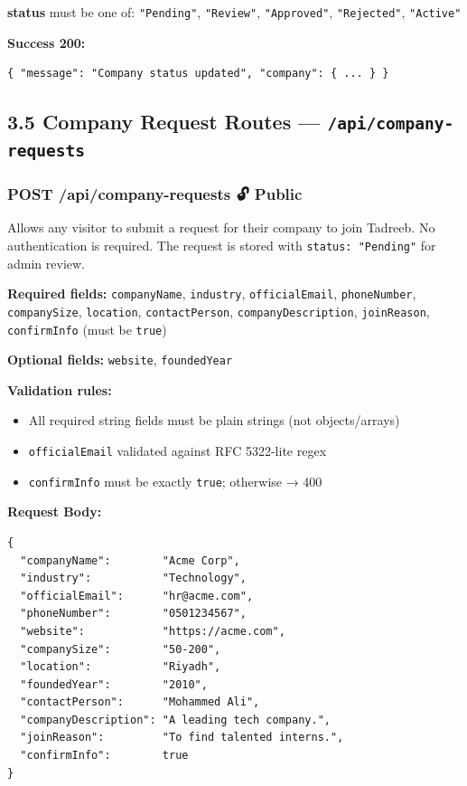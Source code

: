 \documentclass[12pt,a4paper]{article}
\begin{document}
\textbf{status} must be one of: \texttt{"Pending"}, \texttt{"Review"}, \texttt{"Approved"}, \texttt{"Rejected"}, \texttt{"Active"}

\textbf{Success 200:}
\begin{lstlisting}[language={}]
{ "message": "Company status updated", "company": { ... } }
\end{lstlisting}

\vspace{0.5cm}

\subsection*{3.5 Company Request Routes — \texttt{/api/company-requests}}

\subsubsection*{POST /api/company-requests \quad 🔓 Public}

Allows any visitor to submit a request for their company to join Tadreeb. No authentication is required. The request is stored with \texttt{status: "Pending"} for admin review.

\textbf{Required fields:} \texttt{companyName}, \texttt{industry}, \texttt{officialEmail}, \texttt{phoneNumber}, \texttt{companySize}, \texttt{location}, \texttt{contactPerson}, \texttt{companyDescription}, \texttt{joinReason}, \texttt{confirmInfo} (must be \texttt{true})

\textbf{Optional fields:} \texttt{website}, \texttt{foundedYear}

\textbf{Validation rules:}
\begin{itemize}[leftmargin=1.5cm]
  \item All required string fields must be plain strings (not objects/arrays)
  \item \texttt{officialEmail} validated against RFC 5322-lite regex
  \item \texttt{confirmInfo} must be exactly \texttt{true}; otherwise → 400
\end{itemize}

\textbf{Request Body:}
\begin{lstlisting}[language={}]
{
  "companyName":        "Acme Corp",
  "industry":           "Technology",
  "officialEmail":      "hr@acme.com",
  "phoneNumber":        "0501234567",
  "website":            "https://acme.com",
  "companySize":        "50-200",
  "location":           "Riyadh",
  "foundedYear":        "2010",
  "contactPerson":      "Mohammed Ali",
  "companyDescription": "A leading tech company.",
  "joinReason":         "To find talented interns.",
  "confirmInfo":        true
}
\end{lstlisting}
\end{document}
